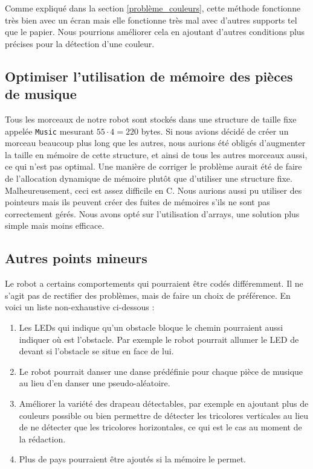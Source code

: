 \documentclass{article}
\begin{document}
    Comme expliqué dans la section \ref{problème_couleurs}, cette méthode fonctionne très bien avec un écran mais elle fonctionne très mal avec d'autres supports tel que le papier. Nous pourrions améliorer cela en ajoutant d'autres conditions plus précises pour la détection d'une couleur.
    
    \subsection{Optimiser l'utilisation de mémoire des pièces de musique}
    Tous les morceaux de notre robot sont stockés dans une structure de taille fixe appelée \texttt{Music} mesurant $55 \cdot 4 = 220$ bytes. 
    Si nous avions décidé de créer un morceau beaucoup plus long que les autres, nous aurions été obligés d'augmenter la taille en mémoire de cette structure, et ainsi de tous les autres morceaux aussi, ce qui n'est pas optimal. 
    Une manière de corriger le problème aurait été de faire de l'allocation dynamique de mémoire plutôt que d'utiliser une structure fixe. 
    Malheureusement, ceci est assez difficile en C. 
    Nous aurions aussi pu utiliser des pointeurs mais ils peuvent créer des fuites de mémoires s'ils ne sont pas correctement gérés. 
    Nous avons opté sur l'utilisation d'arrays, une solution plus simple mais moins efficace.
    
    
    
    
    \subsection{Autres points mineurs}
    Le robot a certains comportements qui pourraient être codés différemment.
    Il ne s'agit pas de rectifier des problèmes, mais de faire un choix de préférence.
    En voici un liste non-exhaustive ci-dessous : 
    \begin{enumerate}
        \item Les LEDs qui indique qu'un obstacle bloque le chemin pourraient aussi indiquer où est l'obstacle.
        Par exemple le robot pourrait allumer le LED de devant si l'obstacle se situe en face de lui.
        \item Le robot pourrait danser une danse prédéfinie pour chaque pièce de musique au lieu d'en danser une pseudo-aléatoire.
        \item Améliorer la variété des drapeau détectables, par exemple en ajoutant plus de couleurs possible ou bien permettre de détecter les tricolores verticales au lieu de ne détecter que les tricolores horizontales, ce qui est le cas au moment de la rédaction.
        \item Plus de pays pourraient être ajoutés si la mémoire le permet.
    \end{enumerate}
    
    \printbibliography
\end{document}
